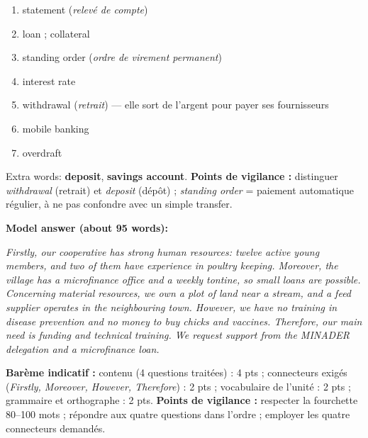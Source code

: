 \documentclass[11pt]{article}
\newcommand{\cle}[1]{{\popxbold\color{popdark}#1}}
\begin{document}
\begin{corrige}
\begin{enumerate}
    \item \cle{statement} (\emph{relevé de compte})
    \item \cle{loan} ; \cle{collateral}
    \item \cle{standing order} (\emph{ordre de virement permanent})
    \item \cle{interest rate}
    \item \cle{withdrawal} (\emph{retrait}) --- elle sort de l'argent pour payer ses fournisseurs
    \item \cle{mobile banking}
    \item \cle{overdraft}
\end{enumerate}
Extra words: \textbf{deposit}, \textbf{savings account}.
\textbf{Points de vigilance :} distinguer \emph{withdrawal} (retrait) et \emph{deposit} (dépôt) ; \emph{standing order} = paiement automatique régulier, à ne pas confondre avec un simple transfer.
\end{corrige}

\begin{corrige}
\textbf{Model answer (about 95 words):}

\emph{Firstly, our cooperative has strong human resources: twelve active young members, and two of them have experience in poultry keeping. Moreover, the village has a microfinance office and a weekly tontine, so small loans are possible. Concerning material resources, we own a plot of land near a stream, and a feed supplier operates in the neighbouring town. However, we have no training in disease prevention and no money to buy chicks and vaccines. Therefore, our main need is funding and technical training. We request support from the MINADER delegation and a microfinance loan.}

\textbf{Barème indicatif :} contenu (4 questions traitées) : 4 pts ; connecteurs exigés (\emph{Firstly, Moreover, However, Therefore}) : 2 pts ; vocabulaire de l'unité : 2 pts ; grammaire et orthographe : 2 pts.
\textbf{Points de vigilance :} respecter la fourchette 80--100 mots ; répondre aux quatre questions dans l'ordre ; employer les quatre connecteurs demandés.
\end{corrige}
\end{document}
